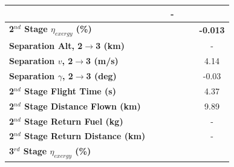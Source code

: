 \begin{table}[ht]
\begin{tabular}{l c c c c c c}
	& \firstsecondSeparationgammamFuelOneHundredFive
	& \firstsecondSeparationgammamFuelOneHundredTen
	& -
	\\
	\hline 
	\textbf{2$^{nd}$ Stage $\eta_{exergy}$ (\%)}
	& \textbf{\secondExergyEffmFuelNinety}
	& \textbf{\secondExergyEffmFuelNinetyFive}
	& \textbf{\secondExergyEffmFuelStandard}
	& \textbf{\secondExergyEffmFuelOneHundredFive}
	& \textbf{\secondExergyEffmFuelOneHundredTen}
	& \textbf{-0.013}
	\\
	\textbf{Separation Alt, 2$\rightarrow$3 (km)}
	& \secondthirdSeparationAltmFuelNinety
	& \secondthirdSeparationAltmFuelNinetyFive
	& \secondthirdSeparationAltmFuelStandard
	& \secondthirdSeparationAltmFuelOneHundredFive
	& \secondthirdSeparationAltmFuelOneHundredTen
	& -
	\\
	\textbf{Separation $v$, 2$\rightarrow$3 (m/s)}
	& \secondthirdSeparationvmFuelNinety
	& \secondthirdSeparationvmFuelNinetyFive
	& \secondthirdSeparationvmFuelStandard
	& \secondthirdSeparationvmFuelOneHundredFive
	& \secondthirdSeparationvmFuelOneHundredTen
	&4.14
	\\
	\textbf{Separation $\gamma$, 2$\rightarrow$3 (deg)}
	& \secondthirdSeparationgammamFuelNinety
	& \secondthirdSeparationgammamFuelNinetyFive
	& \secondthirdSeparationgammamFuelStandard
	& \secondthirdSeparationgammamFuelOneHundredFive
	& \secondthirdSeparationgammamFuelOneHundredTen
	&-0.03
	\\
	\textbf{2$^{nd}$ Stage Flight Time (s)}
	& \secondFlightTimemFuelNinety
	& \secondFlightTimemFuelNinetyFive
	& \secondFlightTimemFuelStandard
	& \secondFlightTimemFuelOneHundredFive
	& \secondFlightTimemFuelOneHundredTen
	&4.37
	\\
	\textbf{2$^{nd}$ Stage Distance Flown (km)}
	& \SecondDistmFuelNinety
	& \SecondDistmFuelNinetyFive
	& \SecondDistmFuelStandard
	& \SecondDistmFuelOneHundredFive
	& \SecondDistmFuelOneHundredTen
	&9.89
	\\
	\textbf{2$^{nd}$ Stage Return Fuel (kg)}
	& \returnFuelmFuelNinety
	& \returnFuelmFuelNinetyFive
	& \returnFuelmFuelStandard
	& \returnFuelmFuelOneHundredFive
	& \returnFuelmFuelOneHundredTen
	& -
	\\
	\textbf{2$^{nd}$ Stage Return Distance (km)}
	& \returnDistmFuelNinety
	& \returnDistmFuelNinetyFive
	& \returnDistmFuelStandard
	& \returnDistmFuelOneHundredFive
	& \returnDistmFuelOneHundredTen
	& -
	\\
	\hline 
	\textbf{3$^{rd}$ Stage $\eta_{exergy}$ (\%)}
	& \textbf{\thirddExergyEffmFuelNinety}
	& \textbf{\thirddExergyEffmFuelNinetyFive}
	& \textbf{\thirddExergyEffmFuelStandard}

\end{tabular}
\end{table}
